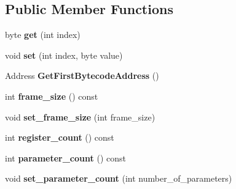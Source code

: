 \subsection*{Public Member Functions}
\begin{DoxyCompactItemize}
\item 
byte {\bfseries get} (int index)\hypertarget{classv8_1_1internal_1_1_bytecode_array_a87384adc223d364eb30b477bc6ffcad2}{}\label{classv8_1_1internal_1_1_bytecode_array_a87384adc223d364eb30b477bc6ffcad2}

\item 
void {\bfseries set} (int index, byte value)\hypertarget{classv8_1_1internal_1_1_bytecode_array_a050bfac7ec5133ffc2648a16baf57207}{}\label{classv8_1_1internal_1_1_bytecode_array_a050bfac7ec5133ffc2648a16baf57207}

\item 
Address {\bfseries Get\+First\+Bytecode\+Address} ()\hypertarget{classv8_1_1internal_1_1_bytecode_array_a87e82c77346fa5b4697d440818e32257}{}\label{classv8_1_1internal_1_1_bytecode_array_a87e82c77346fa5b4697d440818e32257}

\item 
int {\bfseries frame\+\_\+size} () const \hypertarget{classv8_1_1internal_1_1_bytecode_array_ac658fa0ea9b69a1f9c17d3eafb8d8f6b}{}\label{classv8_1_1internal_1_1_bytecode_array_ac658fa0ea9b69a1f9c17d3eafb8d8f6b}

\item 
void {\bfseries set\+\_\+frame\+\_\+size} (int frame\+\_\+size)\hypertarget{classv8_1_1internal_1_1_bytecode_array_a3e42fb5985e884a966420756db4bc961}{}\label{classv8_1_1internal_1_1_bytecode_array_a3e42fb5985e884a966420756db4bc961}

\item 
int {\bfseries register\+\_\+count} () const \hypertarget{classv8_1_1internal_1_1_bytecode_array_a38e917ba0ac9652c2b4d12bd91f5789f}{}\label{classv8_1_1internal_1_1_bytecode_array_a38e917ba0ac9652c2b4d12bd91f5789f}

\item 
int {\bfseries parameter\+\_\+count} () const \hypertarget{classv8_1_1internal_1_1_bytecode_array_aaa694b50d0f169f428ba8c4778ee7b58}{}\label{classv8_1_1internal_1_1_bytecode_array_aaa694b50d0f169f428ba8c4778ee7b58}

\item 
void {\bfseries set\+\_\+parameter\+\_\+count} (int number\+\_\+of\+\_\+parameters)\hypertarget{classv8_1_1internal_1_1_bytecode_array_a5e642ff36f731ddbd7516d4761236d5d}{}\label{classv8_1_1internal_1_1_bytecode_array_a5e642ff36f731ddbd7516d4761236d5d}


\end{DoxyCompactItemize}
